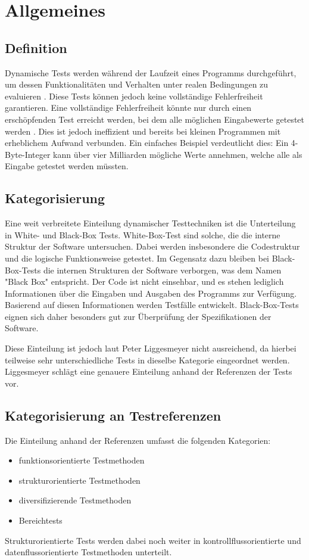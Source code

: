 \documentclass[	%
		fontsize=11pt,  %
		a4paper,	    %
		ngerman,		%
		sans,			%
		f4,				%
	]{HsH-report}		%
\begin{document}
\section{Allgemeines}

\subsection{Definition}
Dynamische Tests werden während der Laufzeit eines Programms durchgeführt, um
dessen Funktionalitäten und Verhalten unter realen Bedingungen zu evaluieren
\cite{liggesmeyer:qualitaet}. Diese Tests können jedoch keine vollständige
Fehlerfreiheit garantieren. Eine vollständige Fehlerfreiheit könnte nur durch
einen erschöpfenden Test erreicht werden, bei dem alle möglichen Eingabewerte
getestet werden \cite{liggesmeyer:qualitaet}. Dies ist jedoch ineffizient und
bereits bei kleinen Programmen mit erheblichem Aufwand verbunden. Ein einfaches
Beispiel verdeutlicht dies: Ein 4-Byte-Integer kann über vier Milliarden
mögliche Werte annehmen, welche alle als Eingabe getestet werden müssten.

\subsection{Kategorisierung}
Eine weit verbreitete Einteilung dynamischer Testtechniken ist die Unterteilung
in White- und Black-Box Tests. White-Box-Test sind solche, die die interne
Struktur der Software untersuchen. Dabei werden insbesondere die Codestruktur
und die logische Funktionsweise getestet. \cite{hanser:qualität} Im Gegensatz
dazu bleiben bei Black-Box-Tests die internen Strukturen der Software
verborgen, was dem Namen "Black Box" entspricht. Der Code ist nicht einsehbar,
und es stehen lediglich Informationen über die Eingaben und Ausgaben des
Programms zur Verfügung. Basierend auf diesen Informationen werden Testfälle
entwickelt. Black-Box-Tests eignen sich daher besonders gut zur Überprüfung der
Spezifikationen der Software. \cite{hanser:qualität}

Diese Einteilung ist jedoch laut Peter Liggesmeyer \cite{liggesmeyer:qualitaet}
nicht ausreichend, da hierbei teilweise sehr unterschiedliche Tests in dieselbe
Kategorie eingeordnet werden. Liggesmeyer schlägt eine genauere Einteilung
anhand der Referenzen der Tests vor.

\subsection{Kategorisierung an Testreferenzen}
Die Einteilung anhand der Referenzen umfasst die folgenden Kategorien:
\begin{itemize}
	\item funktionsorientierte Testmethoden
	\item strukturorientierte Testmethoden
	\item diversifizierende Testmethoden
	\item Bereichtests
\end{itemize}
Strukturorientierte Tests werden dabei noch weiter in kontrollflussorientierte und datenflussorientierte Testmethoden unterteilt.
\end{document}
